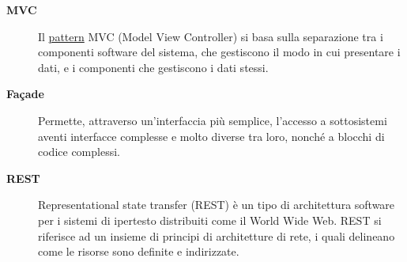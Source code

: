 \documentclass[11pt,a4paper]{article}
\begin{document}
\begin{description}
 \item[\textbf{MVC}] 
Il \underline{pattern} MVC (Model View Controller) si basa sulla separazione tra i componenti software del sistema, che gestiscono il modo in cui presentare i dati, e i componenti che gestiscono i dati stessi. 
 \item[\textbf{Façade}]
Permette, attraverso un'interfaccia più semplice, l'accesso a sottosistemi aventi interfacce complesse e molto diverse tra loro, nonché a blocchi di codice complessi.
\item[\textbf{REST}]
Representational state transfer (REST) è un tipo di architettura software per i sistemi di ipertesto distribuiti come il World Wide Web. 
REST si riferisce ad un insieme di principi di architetture di rete, i quali delineano come le risorse sono definite e indirizzate.


\end{description}
\end{document}
